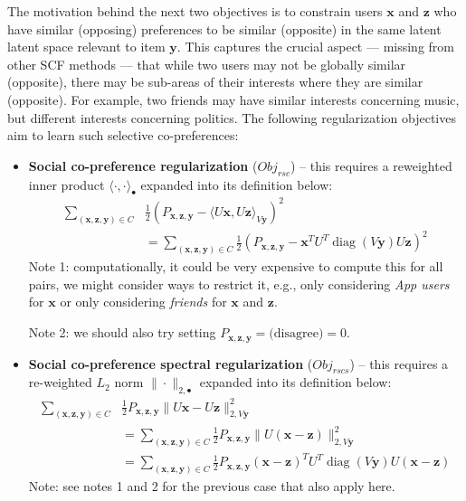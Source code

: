 \documentclass{sig-alternate}
\newcommand{\Obj}{\mathit{Obj}}
\newcommand{\rsc}{\mathit{rsc}}
\newcommand{\rscs}{\mathit{rscs}}
\newcommand{\diag}{\operatorname{diag}}
\newcommand{\x}{\vec{x}}
\newcommand{\y}{\vec{y}}
\newcommand{\z}{\vec{z}}
\newcommand{\la}{\langle}
\newcommand{\ra}{\rangle}
\renewcommand{\vec}[1]{\mathbf{#1}}
\newcommand{\subfive}{\hspace{2.5mm}}
\begin{document}
The motivation behind the next two objectives is to constrain users $\x$
and $\z$ who have similar (opposing) 
preferences to be similar (opposite) in the same latent latent space
relevant to item $\y$.  This captures the crucial aspect --- missing from 
other SCF methods --- that while two users may not be globally similar (opposite),
there may be sub-areas of their interests where they are similar (opposite).
For example, two friends may have similar interests concerning music, but 
different interests concerning politics.  The following regularization objectives
aim to learn such selective co-preferences:
\begin{itemize}
\item {\bf Social co-preference regularization} ($\Obj_\rsc$)
-- this requires a reweighted inner product $\la \cdot, \cdot \ra_{\bullet}$
expanded into its definition below:
\begin{align}
\sum_{(\x,\z,\y) \in C} & \frac{1}{2} (P_{\x,\z,\y} - \la U\x, U\z \ra_{V\y})^2 \nonumber \\
& = \sum_{(\x,\z,\y) \in C} \frac{1}{2} (P_{\x,\z,\y} - \x^T U^T \diag(V\y) U \z)^2
\end{align}
\subfive Note 1: computationally, it could be very expensive to compute this
for all pairs, we might consider ways to restrict it, e.g., only considering
\emph{App users} for $\x$ or only considering \emph{friends} for $\x$ and $\z$.

\subfive Note 2: we should also try setting $P_{\x,\z,\y} = \mbox{(disagree)} = 0$.
\item {\bf Social co-preference spectral regularization}
($\Obj_\rscs$) -- this requires a re-weighted $L_2$ norm 
$\| \cdot \|_{2,\bullet}$ expanded into its definition below:
\begin{align}
\sum_{(\x,\z,\y) \in C} & \frac{1}{2} P_{\x,\z,\y} \| U\x - U\z \|_{2,V\y}^2 \nonumber \\
& = \sum_{(\x,\z,\y) \in C} \frac{1}{2} P_{\x,\z,\y} \| U (\x - \z) \|_{2,V\y}^2 \nonumber \\
& = \sum_{(\x,\z,\y) \in C} \frac{1}{2} P_{\x,\z,\y} (\x - \z)^T U^T \diag(V\y) U (\x - \z)
\end{align}
\subfive Note: see notes 1 and 2 for the previous case that also apply here.
\end{itemize}
\end{document}
